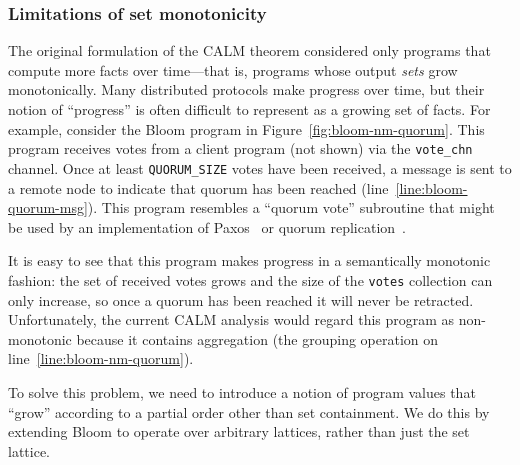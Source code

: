 \subsubsection{Limitations of set monotonicity}
The original formulation of the CALM theorem considered only programs that
compute more facts over time---that is, programs whose output \emph{sets} grow
monotonically. Many distributed protocols make progress over time, but their
notion of ``progress'' is often difficult to represent as a growing set of
facts. For example, consider the Bloom program in
Figure~\ref{fig:bloom-nm-quorum}. This program receives votes from a client
program (not shown) via the \texttt{vote\_chn} channel. Once at least
\texttt{QUORUM\_SIZE} votes have been received, a message is sent to a remote
node to indicate that quorum has been reached
(line~\ref{line:bloom-quorum-msg}). This program resembles a ``quorum vote''
subroutine that might be used by an implementation of Paxos~\cite{Lamport1998}
or quorum replication~\cite{Gifford1979}.

It is easy to see that this program makes progress in a semantically monotonic
fashion: the set of received votes grows and the size of the \texttt{votes}
collection can only increase, so once a quorum has been reached it will never be
retracted. Unfortunately, the current CALM analysis would regard this program as
non-monotonic because it contains aggregation (the grouping operation on
line~\ref{line:bloom-nm-quorum}).

To solve this problem, we need to introduce a notion of program values that
``grow'' according to a partial order other than set containment. We do this by
extending Bloom to operate over arbitrary lattices, rather than just the
set lattice.


